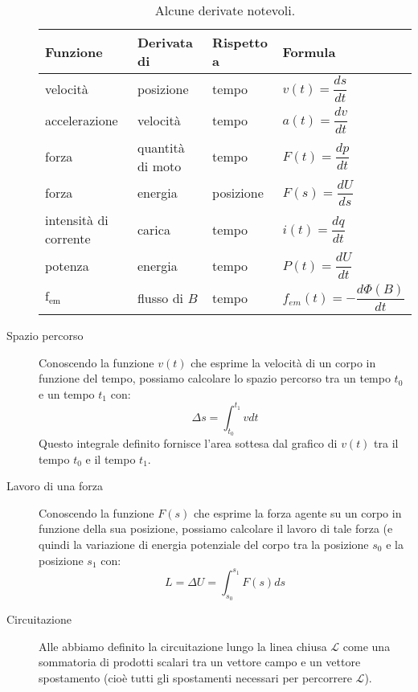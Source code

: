 \documentclass[a4paper,11pt,italian]{article}
\begin{document}
\begin{description}
  \begin{table}[hbtp]\centering
  \begin{tabular}{llll}\toprule
    \textbf{Funzione} & \textbf{Derivata di} & \textbf{Rispetto a} & \textbf{Formula} \\\midrule
    velocità          & posizione            & tempo               & $ v(t) = \dfrac{ds}{dt} $ \\\addlinespace[.8em]
    accelerazione     & velocità             & tempo               & $ a(t) = \dfrac{dv}{dt} $ \\\addlinespace[.8em]
    forza             & quantità di moto     & tempo               & $ F(t) = \dfrac{dp}{dt} $ \\\addlinespace[.8em]
    forza             & energia              & posizione           & $ F(s) = \dfrac{dU}{ds} $ \\\addlinespace[.8em]
    intensità di corrente & carica           & tempo               & $ i(t) = \dfrac{dq}{dt} $ \\\addlinespace[.8em]
    potenza           & energia              & tempo               & $ P(t) = \dfrac{dU}{dt} $ \\\addlinespace[.8em]
    $ \textrm{f}_{\textrm{em}} $ & flusso di $ B $ & tempo         & $ f_{em}(t) = -\dfrac{d\Phi(B)}{dt} $ \\\bottomrule
  \end{tabular}
  \caption{Alcune derivate notevoli.}
  \label{tab:derivatenotevoli}
  \end{table}
  
  \item[Spazio percorso]
  Conoscendo la funzione $ v(t) $ che esprime la velocità di un corpo in funzione del tempo, 
  possiamo calcolare lo spazio percorso tra un tempo $ t_0 $ e un tempo $ t_1 $ con:
  \[ \Delta s = \int_{t_0}^{t_1} v dt \]
  Questo integrale definito fornisce l'area sottesa dal grafico di $ v(t) $ tra il tempo $ t_0 $ e il tempo $ t_1 $.
  
  \item[Lavoro di una forza]
  Conoscendo la funzione $ F(s) $ che esprime la forza agente su un corpo in funzione della sua posizione, 
  possiamo calcolare il lavoro di tale forza (e quindi la variazione di energia potenziale del corpo tra la posizione $ s_0 $ e la posizione $ s_1 $ con:
  \[ L = \Delta U = \int_{s_0}^{s_1} F(s) ds \]
  
  \item[Circuitazione] Alle  abbiamo definito la circuitazione lungo la linea chiusa $ \mathscr{L} $ 
  come una sommatoria di prodotti scalari tra un vettore campo e un vettore spostamento (cioè tutti gli spostamenti necessari per percorrere $ \mathscr{L} $). 
  

\end{description}
\end{document}
